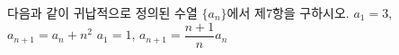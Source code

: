 다음과 같이 귀납적으로 정의된 수열 $\{a_n\}$에서 제$7$항을 구하시오. 
 $a_1=3$, $a_{n+1}=a_n+n^2$
 $a_1=1$, $a_{n+1}=\dfrac{n+1}{n}a_n$
